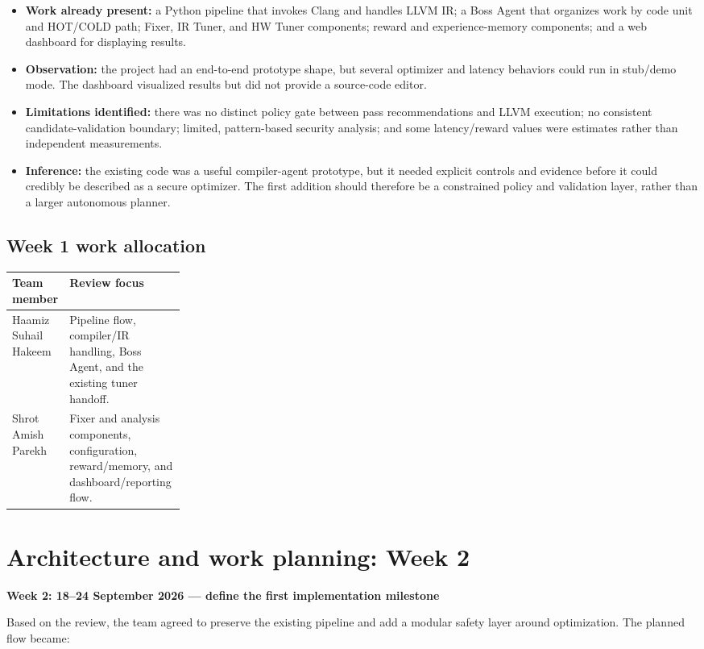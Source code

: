 \documentclass[11pt]{article}
\begin{document}
\begin{itemize}
  \item \textbf{Work already present:} a Python pipeline that invokes Clang and handles LLVM IR; a Boss Agent that organizes work by code unit and HOT/COLD path; Fixer, IR Tuner, and HW Tuner components; reward and experience-memory components; and a web dashboard for displaying results.
  \item \textbf{Observation:} the project had an end-to-end prototype shape, but several optimizer and latency behaviors could run in stub/demo mode. The dashboard visualized results but did not provide a source-code editor.
  \item \textbf{Limitations identified:} there was no distinct policy gate between pass recommendations and LLVM execution; no consistent candidate-validation boundary; limited, pattern-based security analysis; and some latency/reward values were estimates rather than independent measurements.
  \item \textbf{Inference:} the existing code was a useful compiler-agent prototype, but it needed explicit controls and evidence before it could credibly be described as a secure optimizer. The first addition should therefore be a constrained policy and validation layer, rather than a larger autonomous planner.
\end{itemize}

\subsection*{Week 1 work allocation}
\begin{tabularx}{\linewidth}{@{}p{0.25\linewidth}Y@{}}
\toprule
\textbf{Team member} & \textbf{Review focus} \\
\midrule
Haamiz Suhail Hakeem & Pipeline flow, compiler/IR handling, Boss Agent, and the existing tuner handoff. \\
Shrot Amish Parekh & Fixer and analysis components, configuration, reward/memory, and dashboard/reporting flow. \\
\bottomrule
\end{tabularx}

\section{Architecture and work planning: Week 2}
\textbf{Week 2: 18--24 September 2026 --- define the first implementation milestone}

Based on the review, the team agreed to preserve the existing pipeline and add a modular safety layer around optimization. The planned flow became:
\end{document}
